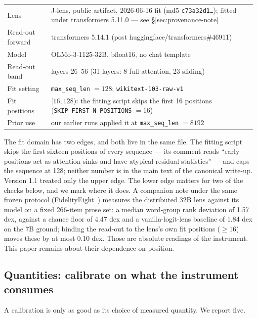 \documentclass[11pt]{article}
\begin{document}
\begin{center}
\small
\begin{tabular}{@{}lp{12.6cm}@{}}
\toprule
Lens & J-lens, public artifact, 2026-06-16 fit (md5 \texttt{c73a32d1\ldots}); fitted under transformers 5.11.0 --- see \S\ref{sec:provenance-note} \\
Read-out forward & transformers 5.14.1 (post huggingface/transformers\#46911) \\
Model & OLMo-3-1125-32B, bfloat16, no chat template \\
Read-out band & layers 26--56 (31 layers: 8 full-attention, 23 sliding) \\
Fit setting & \texttt{max\_seq\_len} $=128$; \texttt{wikitext-103-raw-v1} \\
Fit positions & $[16, 128)$: the fitting script skips the first 16 positions (\texttt{SKIP\_FIRST\_N\_POSITIONS} $=16$) \\
Prior use & our earlier runs applied it at \texttt{max\_seq\_len} $=8192$ \\
\bottomrule
\end{tabular}
\end{center}

The fit domain has two edges, and both live in the same file. The fitting script skips the first sixteen positions of every sequence --- its comment reads ``early positions act as attention sinks and have atypical residual statistics'' --- and caps the sequence at 128; neither number is in the main text of the canonical write-up. Version 1.1 treated only the upper edge. The lower edge matters for two of the checks below, and we mark where it does. A companion note under the same frozen protocol (FidelityEight~\cite{fidelityeight2026}) measures the distributed 32B lens against its model on a fixed 266-item prose set: a median word-group rank deviation of 1.57 dex, against a chance floor of 4.47 dex and a vanilla-logit-lens baseline of 1.84 dex on the 7B ground; binding the read-out to the lens's own fit positions ($\geq 16$) moves these by at most 0.10 dex. Those are absolute readings of the instrument. This paper remains about their dependence on position.

\subsection{Quantities: calibrate on what the instrument consumes}

A calibration is only as good as its choice of measured quantity. We
report five.
\end{document}
